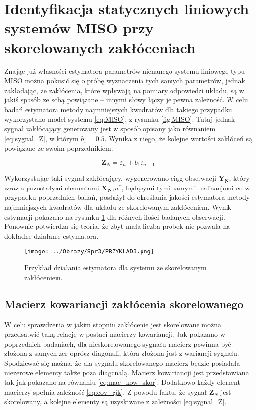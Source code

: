 \documentclass[12pt,a4paper]{article}
\begin{document}
\section{Identyfikacja statycznych liniowych systemów MISO przy skorelowanych zakłóceniach}
Znając już własności estymatora parametrów nienanego systemu liniowego typu MISO można pokusić się o próbę wyznaczenia tych samych parametrów, jednak zakładając, że zakłócenia, które wpływają na pomiary odpowiedzi układu, są w jakiś sposób ze sobą powiązane -- innymi słowy łączy je pewna zależność.
W celu badań estymatora metody najmniejszych kwadratów dla takiego przypadku wykorzystano model systemu \ref{eq:MISO}, z rysunku \ref{fig:MISO}.
Tutaj jednak sygnał zakłócający generowany jest w sposób opisany jako równaniem \ref{eq:sygnal_Z}, w którym $b_{1} = 0.5$.
Wynika z niego, że kolejne wartości zakłóceń są powiązane ze swoim poprzednikiem.

\begin{equation}\label{eq:sygnal_Z}
\boldsymbol{Z}_{N} = \varepsilon_{n}+b_{1}\varepsilon_{n-1}
\end{equation}

Wykorzystując taki sygnał zakłócający, wygenerowano ciąg obserwacji $\boldsymbol{Y_{N}}$, który wraz z pozostałymi elementami $\boldsymbol{X_{N}},a^{*}$, będącymi tymi samymi realizacjami co w przypadku poprzednich badań, posłużył do określania jakości estymatora metody najmniejszych kwadratów dla układu ze skorelowanym zakłóceniem. 
Wynik estymacji pokazano na rysunku \ref{fig:przyklad3} dla różnych ilości badanych obserwacji.
Ponownie potwierdza się teoria, że zbyt mała liczba próbek nie pozwala na dokładne działanie estymatora.

\begin{figure}[H]
\centering
\texttt{[image: ../Obrazy/Spr3/PRZYKLAD3.png]} 
\caption{Przykład działania estymatora dla systemu ze skorelowanym zakłóceniem.}
\label{fig:przyklad3}
\end{figure}

\subsection{Macierz kowariancji zakłócenia skorelowanego}
W celu sprawdzenia w jakim stopniu zakłócenie jest skorelowane można przedsatwić taką relację w postaci macierzy kowariancji.
Jak pokazano w poprzednich badaniach, dla nieskorelowanego sygnału macierz powinna być złożona z samych zer oprócz diagonali, która złożona jest z wariancji sygnału.
Spodziewać się można, że dla sygnału skorelowanego macierz będzie posiadała niezerowe elementy także poza diagonalą.
Macierz kowariancji jest przedstawiana tak jak pokazano na równaniu \ref{eq:mac_kow_skor}.
Dodatkowo każdy element macierzy spełnia zależność \ref{eq:cov_cjk}. Z powodu faktu, że sygnał $\boldsymbol{Z}_{N}$ jest skorelowany, a kolejne elementy są uzyskiwane z zależności \ref{eq:sygnal_Z}.
\end{document}
